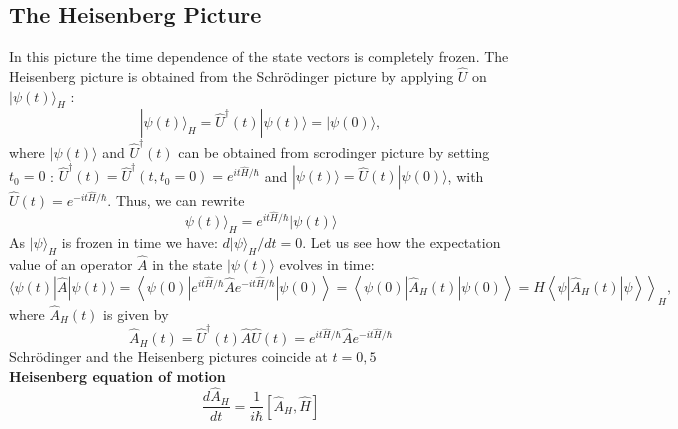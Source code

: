\subsection{The Heisenberg Picture}
In this picture the time dependence of the state vectors is completely frozen. The Heisenberg picture is obtained from the Schrödinger picture by applying $\hat{U}$ on $|\psi(t)\rangle_{H}$ :
$$
|\psi(t)\rangle_{H}=\hat{U}^{\dagger}(t)|\psi(t)\rangle=|\psi(0)\rangle,
$$
where $|\psi(t)\rangle$ and $\hat{U}^{\dagger}(t)$ can be obtained from scrodinger picture by setting $t_{0}=0$ : $\hat{U}^{\dagger}(t)=\hat{U}^{\dagger}\left(t, t_{0}=0\right)=e^{i t \hat{H} / \hbar}$ and $|\psi(t)\rangle=\hat{U}(t)|\psi(0)\rangle$, with $\hat{U}(t)=e^{-i t \hat{H} / \hbar}$. Thus, we can rewrite \\
$$\psi(t)\rangle_{H}=e^{i t \hat{H} / \hbar}|\psi(t)\rangle$$
As $|\psi\rangle_{H}$ is frozen in time we have: $d|\psi\rangle_{H} / d t=0$. Let us see how the expectation value of an operator $\hat{A}$ in the state $|\psi(t)\rangle$ evolves in time:
$$
\left.\langle\psi(t)|\hat{A}| \psi(t)\rangle=\left\langle\psi(0)\left|e^{i t \hat{H} / \hbar} \hat{A} e^{-i t \hat{H} / \hbar}\right| \psi(0)\right\rangle=\left\langle\psi(0)\left|\hat{A}_{H}(t)\right| \psi(0)\right\rangle=H\left\langle\psi\left|\hat{A}_{H}(t)\right| \psi\right\rangle\right\rangle_{H},
$$
where $\hat{A}_{H}(t)$ is given by\\
$$\hat{A}_{H}(t)=\hat{U}^{\dagger}(t) \hat{A} \hat{U}(t)=e^{i t \hat{H} / \hbar} \hat{A} e^{-i t \hat{H} / \hbar}$$
Schrödinger and the Heisenberg pictures coincide at $t=0,5$ \\
\textbf{Heisenberg equation of motion}\\
$$\frac{d\hat{A}_H}{dt}=\frac{1}{i\hbar}\left[\hat{A}_H,\hat{H}\right] $$ 
